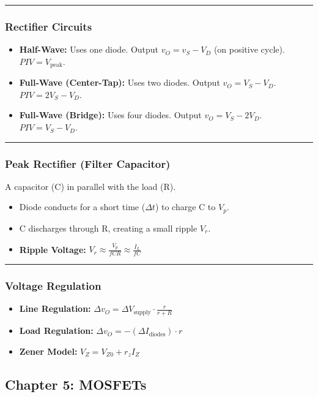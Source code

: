 \documentclass[10pt, letterpaper]{article}
\begin{document}
\hrule

\subsubsection*{Rectifier Circuits}
\begin{itemize}
    \item \textbf{Half-Wave:} Uses one diode. Output $v_O = v_S - V_D$ (on positive cycle). $PIV = V_{\text{peak}}$.
    \item \textbf{Full-Wave (Center-Tap):} Uses two diodes. Output $v_O = V_S - V_D$. $PIV = 2V_S - V_D$.
    \item \textbf{Full-Wave (Bridge):} Uses four diodes. Output $v_O = V_S - 2V_D$. $PIV = V_S - V_D$.
\end{itemize}

\hrule

\subsubsection*{Peak Rectifier (Filter Capacitor)}
A capacitor (C) in parallel with the load (R).
\begin{itemize}
    \item Diode conducts for a short time ($\Delta t$) to charge C to $V_p$.
    \item C discharges through R, creating a small ripple $V_r$.
    \item \textbf{Ripple Voltage:} $V_r \approx \frac{V_p}{fCR} \approx \frac{I_L}{fC}$
\end{itemize}

\hrule

\subsubsection*{Voltage Regulation}
\begin{itemize}
    \item \textbf{Line Regulation:} $\Delta v_O = \Delta V_{\text{supply}} \cdot \frac{r}{r + R}$
    \item \textbf{Load Regulation:} $\Delta v_O = -(\Delta I_{\text{diodes}}) \cdot r$
    \item \textbf{Zener Model:} $V_Z = V_{Z0} + r_z I_Z$
\end{itemize}

\newpage
\subsection*{Chapter 5: MOSFETs}
\end{document}
